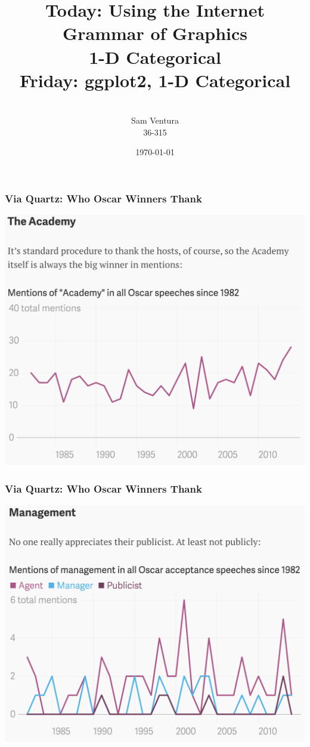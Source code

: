 \documentclass{beamer} %
\begin{document}
\title[dedup]{Today:  Using the Internet \\ Grammar of Graphics \\ 1-D Categorical \\ Friday:  ggplot2, 1-D Categorical}


\author[Samuel L. Ventura]{\\
  \large{Sam Ventura\\36-315}}
\date{\today}


\begin{frame}
	\maketitle
	
\end{frame}


\begin{frame}\frametitle{Via Quartz:  Who Oscar Winners Thank}
	\includegraphics[width=0.7\linewidth]{academy.png}
\end{frame}

\begin{frame}\frametitle{Via Quartz:  Who Oscar Winners Thank}
	\includegraphics[width=0.7\linewidth]{management.png}
\end{frame}
\end{document}
